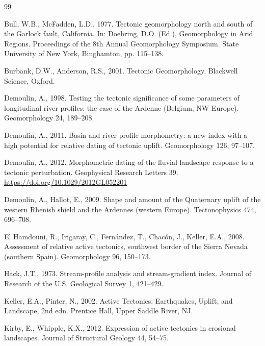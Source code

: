 \documentclass[10pt,a4paper,twocolumn]{article}
\begin{document}
\begin{thebibliography}{99}
\setlength{\itemsep}{1pt}
\footnotesize

Bull, W.B., McFadden, L.D., 1977. Tectonic geomorphology north and south of the Garlock fault,
California. In: Doehring, D.O. (Ed.), Geomorphology in Arid Regions. Proceedings of the 8th Annual
Geomorphology Symposium. State University of New York, Binghamton, pp. 115--138.

Burbank, D.W., Anderson, R.S., 2001. Tectonic Geomorphology. Blackwell Science, Oxford.

Demoulin, A., 1998. Testing the tectonic significance of some parameters of longitudinal river
profiles: the case of the Ardenne (Belgium, NW Europe). Geomorphology 24, 189--208.

Demoulin, A., 2011. Basin and river profile morphometry: a new index with a high potential for
relative dating of tectonic uplift. Geomorphology 126, 97--107.

Demoulin, A., 2012. Morphometric dating of the fluvial landscape response to a tectonic perturbation.
Geophysical Research Letters 39. \url{https://doi.org/10.1029/2012GL052201}

Demoulin, A., Hallot, E., 2009. Shape and amount of the Quaternary uplift of the western Rhenish
shield and the Ardennes (western Europe). Tectonophysics 474, 696--708.

El Hamdouni, R., Irigaray, C., Fernández, T., Chacón, J., Keller, E.A., 2008. Assessment of relative
active tectonics, southwest border of the Sierra Nevada (southern Spain). Geomorphology 96, 150--173.

Hack, J.T., 1973. Stream-profile analysis and stream-gradient index. Journal of Research of the U.S.
Geological Survey 1, 421--429.

Keller, E.A., Pinter, N., 2002. Active Tectonics: Earthquakes, Uplift, and Landscape, 2nd edn.
Prentice Hall, Upper Saddle River, NJ.

Kirby, E., Whipple, K.X., 2012. Expression of active tectonics in erosional landscapes. Journal of
Structural Geology 44, 54--75.


\end{thebibliography}
\end{document}
